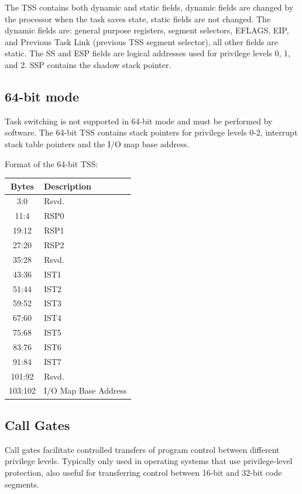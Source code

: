 \documentclass{article}
\newcommand{\layout}[1]{\parbox{\linewidth}{#1}}
\begin{document}
\layout{
  The TSS contains both dynamic and static fields, dynamic fields are changed by the processor when the task saves state, static fields are not changed.
  The dynamic fields are: general purpose registers, segment selectors, EFLAGS, EIP, and Previous Task Link (previous TSS segment selector), all other fields are static.
  The SS and ESP fields are logical addresses used for privilege levels 0, 1, and 2.
  SSP contains the shadow stack pointer.

  \bigskip \cite[Chapter~9.2.1]{sdm3}
}

\layout{
  \subsection{64-bit mode}

  Task switching is not supported in 64-bit mode and must be performed by software.
  The 64-bit TSS contains stack pointers for privilege levels 0-2, interrupt stack table pointers and the I/O map base address.

  \bigskip

  Format of the 64-bit TSS:
  \begin{table}[H]
    \centering
    \begin{tabular}{|c|l|}
      \hline \textbf{Bytes} & \textbf{Description} \\ \hline
      3:0 & Rsvd. \\
      11:4 & RSP0 \\
      19:12 & RSP1 \\
      27:20 & RSP2 \\
      35:28 & Rsvd. \\
      43:36 & IST1 \\
      51:44 & IST2 \\
      59:52 & IST3 \\
      67:60 & IST4 \\
      75:68 & IST5 \\
      83:76 & IST6 \\
      91:84 & IST7 \\
      101:92 & Rsvd. \\
      103:102 & I/O Map Base Address \\ \hline
    \end{tabular}
  \end{table}

  \cite[Chapter~9.7]{sdm3}
}

\layout{
  \subsection{Call Gates}

  Call gates facilitate controlled transfers of program control between different privilege levels.
  Typically only used in operating systems that use privilege-level protection, also useful for transferring control between 16-bit and 32-bit code segments.
} \bigskip
\end{document}
